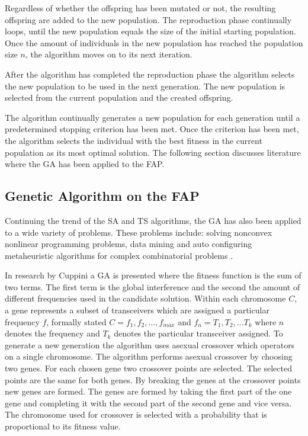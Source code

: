 Regardless of whether the offspring has been mutated or not, the resulting offspring are added to the new population. The reproduction phase continually loops, until the new population equals the size of the initial starting population. Once the amount of individuals in the new population has reached the population size $n$, the algorithm moves on to its next iteration.

After the algorithm has completed the reproduction phase the algorithm selects the new population to be used in the next generation. The new population is selected from the current population and the created offspring.

The algorithm continually generates a new population for each generation until a predetermined stopping criterion has been met. Once the criterion has been met, the algorithm selects the individual with the best fitness in the current population as its most optimal solution. The following section discusses literature where the \gls{GA} has been applied to the \gls{FAP}.

\subsection{Genetic Algorithm on the \gls{FAP}}
\label{sec:gaonfap}
Continuing the trend of the \gls{SA} and \gls{TS} algorithms, the \gls{GA} has also been applied to a wide variety of problems. These problems include: solving nonconvex nonlinear programming problems\cite{GANonConvex}, data mining \cite{SelfAdaptiveDataMiningGA} and auto configuring metaheuristic algorithms for complex combinatorial problems \cite{AutoComplexMeta}.

In research by Cuppini\cite{GACuppini} a \gls{GA} is presented where the fitness function is the sum of two terms. The first term is the global interference and the second the amount of different frequencies used in the candidate solution. Within each chromosome $C$, a gene represents a subset of transceivers which are assigned a particular frequency $f$, formally stated $C = {f_1,f_2, ..., f_{max}}$ and $f_n = {T_1, T_2, ... T_k}$ where $n$ denotes the frequency and $T_k$ denotes the particular transceiver assigned. To generate a new generation the algorithm uses asexual crossover which operators on a single chromosome. The algorithm performs asexual crossover by choosing two genes. For each chosen gene two crossover points are selected. The selected points are the same for both genes. By breaking the genes at the crossover points new genes are formed. The genes are formed by taking the first part of the one gene and completing it with the second part of the second gene and vice versa. The chromosome used for crossover is selected with a probability that is proportional to its fitness value.

